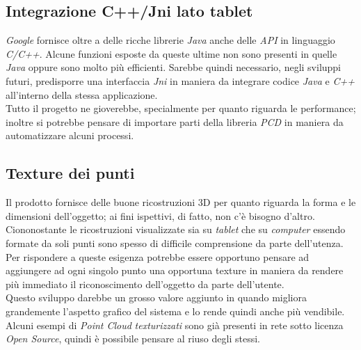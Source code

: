 \subsection{Integrazione C++/Jni lato tablet}
\emph{Google} fornisce oltre a delle ricche librerie \emph{Java} anche delle \emph{API} in linguaggio \emph{C/C++}. Alcune funzioni esposte da queste ultime non sono presenti in quelle \emph{Java} oppure sono molto più efficienti. Sarebbe quindi necessario, negli sviluppi futuri, predisporre una interfaccia \emph{Jni} in maniera da integrare codice \emph{Java} e \emph{C++} all'interno della stessa applicazione.\\
Tutto il progetto ne gioverebbe, specialmente per quanto riguarda le performance; inoltre si potrebbe pensare di importare parti della libreria \emph{PCD} in maniera da automatizzare alcuni processi.

\subsection{Texture dei punti}
Il prodotto fornisce delle buone ricostruzioni 3D per quanto riguarda la forma e le dimensioni dell'oggetto; ai fini ispettivi, di fatto, non c'è bisogno d'altro. Ciononostante le ricostruzioni visualizzate sia su \emph{tablet} che su \emph{computer} essendo formate da soli punti sono spesso di difficile comprensione da parte dell'utenza. Per rispondere a queste esigenza potrebbe essere opportuno pensare ad aggiungere ad ogni singolo punto una opportuna texture in maniera da rendere più immediato il riconoscimento dell'oggetto da parte dell'utente.\\
Questo sviluppo darebbe un grosso valore aggiunto in quando migliora grandemente l'aspetto grafico del sistema e lo rende quindi anche più vendibile.\\
Alcuni esempi di \emph{Point Cloud} \emph{texturizzati} sono già presenti in rete sotto licenza \emph{Open Source}, quindi è possibile pensare al riuso degli stessi.

